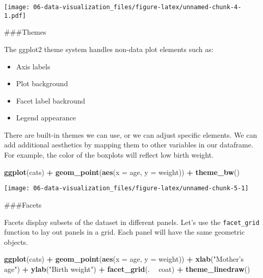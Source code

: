 \documentclass[11pt,]{article}
\newenvironment{Shaded}{\begin{snugshade}}{\end{snugshade}}
\newcommand{\DataTypeTok}[1]{\textcolor[rgb]{0.13,0.29,0.53}{#1}}
\newcommand{\KeywordTok}[1]{\textcolor[rgb]{0.13,0.29,0.53}{\textbf{#1}}}
\newcommand{\NormalTok}[1]{#1}
\newcommand{\OperatorTok}[1]{\textcolor[rgb]{0.81,0.36,0.00}{\textbf{#1}}}
\newcommand{\StringTok}[1]{\textcolor[rgb]{0.31,0.60,0.02}{#1}}
\providecommand{\tightlist}{%
  \setlength{\itemsep}{0pt}\setlength{\parskip}{0pt}}
\begin{document}
\texttt{[image: 06-data-visualization\_files/figure-latex/unnamed-chunk-4-1.pdf]}

\#\#\#Themes

The ggplot2 theme system handles non-data plot elements such as:

\begin{itemize}
\tightlist
\item
  Axis labels
\item
  Plot background
\item
  Facet label backround
\item
  Legend appearance
\end{itemize}

There are built-in themes we can use, or we can adjust specific
elements. We can add additional aesthetics by mapping them to other
variables in our dataframe. For example, the color of the boxplots will
reflect low birth weight.

\begin{Shaded}
\begin{Highlighting}[]
\KeywordTok{ggplot}\NormalTok{(cats) }\OperatorTok{+}
\StringTok{    }\KeywordTok{geom_point}\NormalTok{(}\KeywordTok{aes}\NormalTok{(}\DataTypeTok{x =}\NormalTok{ age, }\DataTypeTok{y =}\NormalTok{ weight)) }\OperatorTok{+}
\StringTok{    }\KeywordTok{theme_bw}\NormalTok{()}
\end{Highlighting}
\end{Shaded}

\begin{center}\texttt{[image: 06-data-visualization\_files/figure-latex/unnamed-chunk-5-1]} \end{center}

\#\#\#Facets

Facets display subsets of the dataset in different panels. Let's use the
\texttt{facet\_grid} function to lay out panels in a grid. Each panel
will have the same geometric objects.

\begin{Shaded}
\begin{Highlighting}[]
\KeywordTok{ggplot}\NormalTok{(cats) }\OperatorTok{+}
\StringTok{    }\KeywordTok{geom_point}\NormalTok{(}\KeywordTok{aes}\NormalTok{(}\DataTypeTok{x =}\NormalTok{ age, }\DataTypeTok{y =}\NormalTok{ weight)) }\OperatorTok{+}
\StringTok{    }\KeywordTok{xlab}\NormalTok{(}\StringTok{"Mother's age"}\NormalTok{) }\OperatorTok{+}
\StringTok{    }\KeywordTok{ylab}\NormalTok{(}\StringTok{"Birth weight"}\NormalTok{) }\OperatorTok{+}
\StringTok{    }\KeywordTok{facet_grid}\NormalTok{(. }\OperatorTok{~}\StringTok{ }\NormalTok{coat) }\OperatorTok{+}
\StringTok{    }\KeywordTok{theme_linedraw}\NormalTok{()}
\end{Highlighting}
\end{Shaded}
\end{document}
